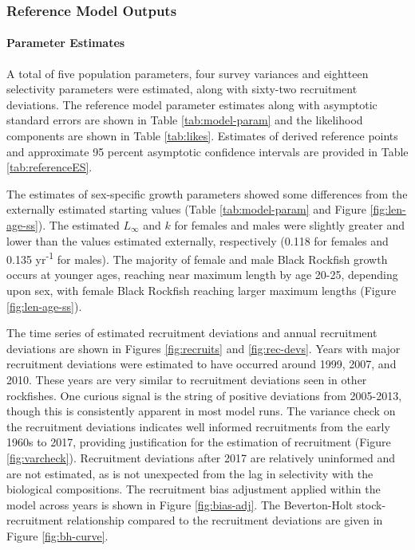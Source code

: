 \documentclass[11pt,
  english,
  letterpaper,
]{article}
\begin{document}
\hypertarget{reference-model-outputs}{%
\subsubsection{Reference Model Outputs}\label{reference-model-outputs}}

\hypertarget{parameter-estimates}{%
\paragraph{Parameter Estimates}\label{parameter-estimates}}

A total of five population parameters, four survey variances and eightteen selectivity parameters were estimated, along with sixty-two recruitment deviations. The reference model parameter estimates along with asymptotic standard errors are shown in Table \ref{tab:model-param} and the likelihood components are shown in Table \ref{tab:likes}. Estimates of derived reference points and approximate 95 percent asymptotic confidence intervals are provided in Table \ref{tab:referenceES}.

The estimates of sex-specific growth parameters showed some differences from the externally estimated starting values (Table \ref{tab:model-param} and Figure \ref{fig:len-age-ss}). The estimated \(L_{\infty}\) and \(k\) for females and males were slightly greater and lower than the values estimated externally, respectively (0.118 for females and 0.135 yr\textsuperscript{-1} for males). The majority of female and male Black Rockfish growth occurs at younger ages, reaching near maximum length by age 20-25, depending upon sex, with female Black Rockfish reaching larger maximum lengths (Figure \ref{fig:len-age-ss}).

The time series of estimated recruitment deviations and annual recruitment deviations are shown in Figures \ref{fig:recruits} and \ref{fig:rec-devs}. Years with major recruitment deviations were estimated to have occurred around 1999, 2007, and 2010. These years are very similar to recruitment deviations seen in other rockfishes. One curious signal is the string of positive deviations from 2005-2013, though this is consistently apparent in most model runs. The variance check on the recruitment deviations indicates well informed recruitments from the early 1960s to 2017, providing justification for the estimation of recruitment (Figure \ref{fig:varcheck}). Recruitment deviations after 2017 are relatively uninformed and are not estimated, as is not unexpected from the lag in selectivity with the biological compositions. The recruitment bias adjustment applied within the model across years is shown in Figure \ref{fig:bias-adj}. The Beverton-Holt stock-recruitment relationship compared to the recruitment deviations are given in Figure \ref{fig:bh-curve}.
\end{document}
